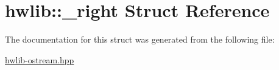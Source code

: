 \hypertarget{structhwlib_1_1__right}{}\section{hwlib\+:\+:\+\_\+right Struct Reference}
\label{structhwlib_1_1__right}


The documentation for this struct was generated from the following file\+:\begin{DoxyCompactItemize}
\item 
\hyperlink{hwlib-ostream_8hpp}{hwlib-\/ostream.\+hpp}\end{DoxyCompactItemize}
